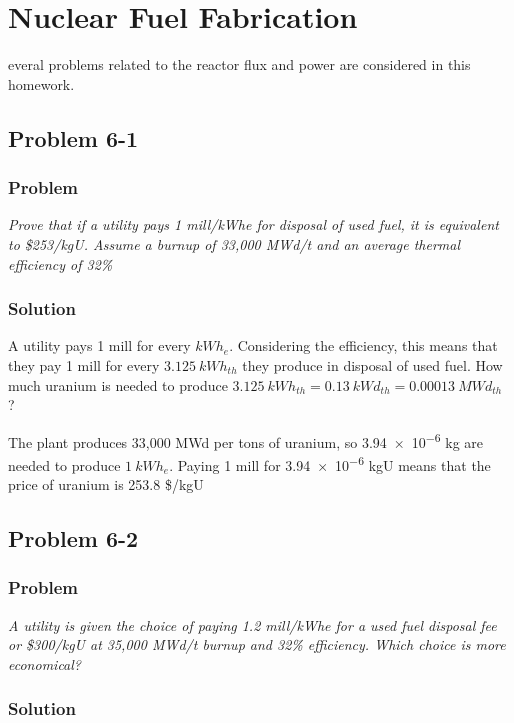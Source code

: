 %
%
\let\textcircled=\pgftextcircled
\chapter{Nuclear Fuel Fabrication}
\label{chap:intro}

everal problems related to the reactor flux and power are considered in this homework.

\section{Problem 6-1}
\label{prob61}


\subsection{Problem}
\textit{Prove that if a utility pays 1 mill/kWhe for disposal of used fuel, it is equivalent to \$253/kgU. Assume a burnup of 33,000 MWd/t and an average thermal efficiency of 32\%}

\subsection{Solution}

A utility pays 1 mill for every $kWh_e$. Considering the efficiency, this means that they pay 1 mill for every $3.125\ kWh_{th}$ they produce in disposal of used fuel. How much uranium is needed to produce $3.125\ kWh_{th} = 0.13\ kWd_{th} = 0.00013\ MWd_{th}$ ?

The plant produces 33,000 MWd per tons of uranium, so \num{3.94e-6} kg are needed to produce $1\ kWh_e$. Paying 1 mill for \num{3.94e-6} kgU means that the price of uranium is 253.8 \$/kgU


\section{Problem 6-2}
\label{prob62}


\subsection{Problem}
\textit{A utility is given the choice of paying 1.2 mill/kWhe for a used fuel disposal fee or \$300/kgU at 35,000 MWd/t burnup and 32\% efficiency. Which choice is more economical?}

\subsection{Solution}

